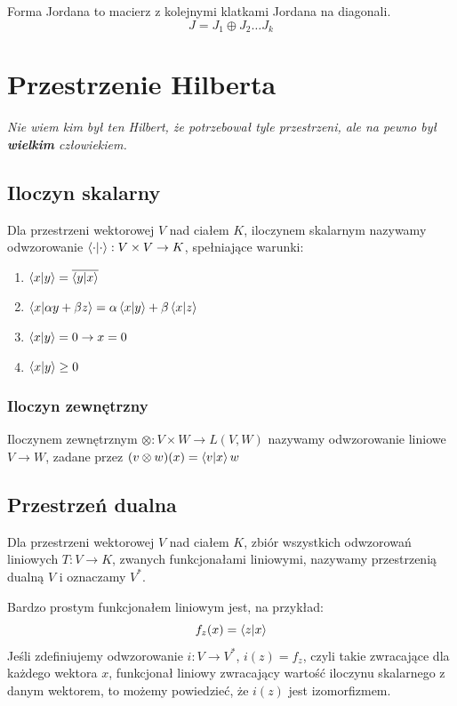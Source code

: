 \documentclass{../notatki}
\begin{document}
Forma Jordana to macierz z kolejnymi klatkami Jordana na diagonali.
$$
J = J_1 \oplus J_2 \dots J_k
$$

\section{Przestrzenie Hilberta}

\textit{Nie wiem kim był ten Hilbert, że potrzebował tyle przestrzeni, ale na
pewno był \textbf{wielkim} człowiekiem.}

\subsection{Iloczyn skalarny}

Dla przestrzeni wektorowej $V$ nad ciałem $K$, iloczynem skalarnym nazywamy
odwzorowanie $\braket{\cdot}{\cdot} : V \times V \to K$, spełniające warunki:
\begin{enumerate}
  \item $\braket{x}{y} = \overline{\braket{y}{x}}$
  \item $\braket{x}{\alpha y + \beta z} = \alpha \braket{x}{y} + \beta
    \braket{x}{z}$
  \item $\braket{x}{y} = 0 \rightarrow x = 0$
  \item $\braket{x}{y} \geq 0$
\end{enumerate}

\subsubsection{Iloczyn zewnętrzny}

Iloczynem zewnętrznym $\otimes: V \times W \to L(V, W)$ nazywamy odwzorowanie
liniowe $V \to W$, zadane przez $(v \otimes w)(x) = \braket{v}{x}w$

\subsection{Przestrzeń dualna}

Dla przestrzeni wektorowej $V$ nad ciałem $K$,
zbiór wszystkich odwzorowań liniowych $T: V \to K$, zwanych
funkcjonałami liniowymi, nazywamy przestrzenią dualną $V$ i oznaczamy $V^*$.

Bardzo prostym funkcjonałem liniowym jest, na przykład:
$$
f_z(x) = \braket{z}{x}
$$
Jeśli zdefiniujemy odwzorowanie $i: V \to V^*$, $i(z) = f_z$,
czyli takie zwracające dla każdego wektora $x$, funkcjonał liniowy zwracający
wartość iloczynu skalarnego z danym wektorem, to możemy powiedzieć, że $i(z)$
jest izomorfizmem.
\end{document}
